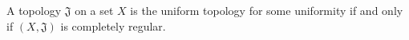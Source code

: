 A topology $\mathfrak{J}$ on a set $X$ is the uniform topology for some uniformity if and only if $(X, \mathfrak{J})$ is completely regular.

